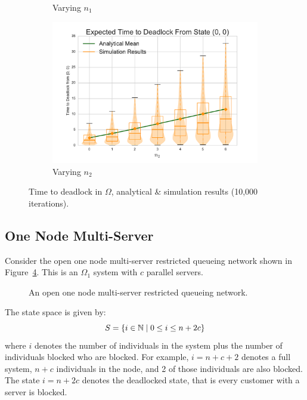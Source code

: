 \documentclass{article}
\numberwithin{equation}{section}
\begin{document}
\begin{figure}[!htbp]
\begin{center}
\begin{subfigure}[b]{0.35\textwidth}
  \caption{Varying $n_1$}
  \label{fig:timestodeadlockfb_n1}
\end{subfigure}
\begin{subfigure}[b]{0.35\textwidth}
  \includegraphics[width=\textwidth]{images/vary_n2fb}
  \caption{Varying $n_2$}
  \label{fig:timestodeadlockfb_n2}
\end{subfigure}
\end{center}
\caption{Time to deadlock in $\Omega$, analytical \& simulation results (10,000 iterations).}
\label{fig:timestodeadlockfeedback}
\end{figure}


\subsection{One Node Multi-Server}\label{sec:1nodeMS}

Consider the open one node multi-server restricted queueing network shown in Figure~\ref{fig:queueingnetwork_1nodemulti}.
This is an $\Omega_1$ system with $c$ parallel servers.

\begin{figure}[!htbp]
  \begin{center}
  
  \end{center}
  \caption{An open one node multi-server restricted queueing network.}
  \label{fig:queueingnetwork_1nodemulti}
\end{figure}

The state space is given by:
        \[S = \{i\in\mathbb{N} \nonscript\; | \nonscript\; 0 \leq i \leq n + 2c\}\]
where \(i\) denotes the number of individuals in the system plus the number of individuals blocked who are blocked.
For example, $i=n+c+2$ denotes a full system, $n+c$ individuals in the node, and 2 of those individuals are also blocked.
The state $i=n+2c$ denotes the deadlocked state, that is every customer with a server is blocked.
\end{document}
